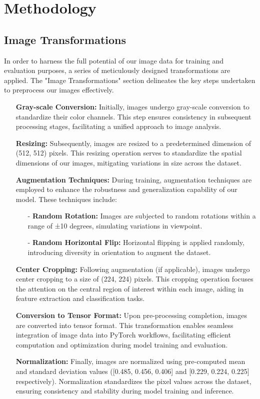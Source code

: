 \documentclass[conference]{IEEEtran}
\begin{document}
\section{\textbf{Methodology}}

\subsection{\textbf{Image Transformations}}
In order to harness the full potential of our image data for training and evaluation purposes, a series of meticulously designed transformations are applied. The "Image Transformations" section delineates the key steps undertaken to preprocess our images effectively. \\

\begin{itemize}
    \item[] \textbf{Gray-scale Conversion:} Initially, images undergo gray-scale conversion to standardize their color channels. This step ensures consistency in subsequent processing stages, facilitating a unified approach to image analysis. 
    \item[] \textbf{Resizing:} Subsequently, images are resized to a predetermined dimension of (512, 512) pixels. This resizing operation serves to standardize the spatial dimensions of our images, mitigating variations in size across the dataset. 
    \item[] \textbf{Augmentation Techniques:} During training, augmentation techniques are employed to enhance the robustness and generalization capability of our model. These techniques include:
    \begin{itemize}
        \item[-] \textbf{Random Rotation:} Images are subjected to random rotations within a range of ±10 degrees, simulating variations in viewpoint. 
        \item[-] \textbf{Random Horizontal Flip:} Horizontal flipping is applied randomly, introducing diversity in orientation to augment the dataset. 
    \end{itemize} 
    \item[] \textbf{Center Cropping:} Following augmentation (if applicable), images undergo center cropping to a size of (224, 224) pixels. This cropping operation focuses the attention on the central region of interest within each image, aiding in feature extraction and classification tasks. 
    \item[] \textbf{Conversion to Tensor Format:} Upon pre-processing completion, images are converted into tensor format. This transformation enables seamless integration of image data into PyTorch workflows, facilitating efficient computation and optimization during model training and evaluation. 
    \item[] \textbf{Normalization:} Finally, images are normalized using pre-computed mean and standard deviation values ([0.485, 0.456, 0.406] and [0.229, 0.224, 0.225] respectively). Normalization standardizes the pixel values across the dataset, ensuring consistency and stability during model training and inference. 
\end{itemize}
\end{document}

